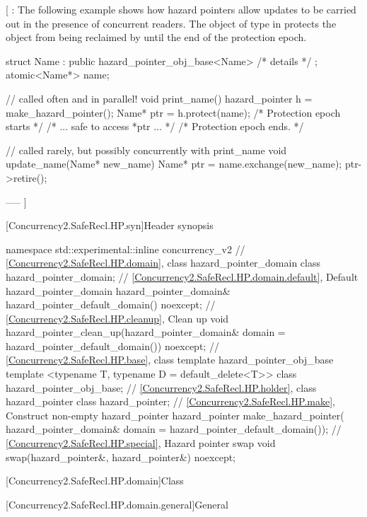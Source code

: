 [ : The following example shows how hazard pointers allow updates to be carried out in the presence of concurrent readers. The object of type  in  protects the object  from being reclaimed by  until the end of the protection epoch.

\begin{codeblock}
struct Name : public hazard_pointer_obj_base<Name> { /* details */ };
atomic<Name*> name;

// called often and in parallel!
void print_name() {
  hazard_pointer h = make_hazard_pointer();
  Name* ptr = h.protect(name); /* Protection epoch starts */
  /* ... safe to access *ptr ... */
} /* Protection epoch ends. */

// called rarely, but possibly concurrently with print_name
void update_name(Name* new_name) {
  Name* ptr = name.exchange(new_name);
  ptr->retire();
}
\end{codeblock}
--—  ]

[Concurrency2.SafeRecl.HP.syn]{Header  synopsis}

\begin{codeblock}
namespace std::experimental::inline concurrency_v2 {
  // \ref{Concurrency2.SafeRecl.HP.domain}, class hazard_pointer_domain
  class hazard_pointer_domain;
  // \ref{Concurrency2.SafeRecl.HP.domain.default}, Default hazard_pointer_domain
  hazard_pointer_domain& hazard_pointer_default_domain() noexcept;
  // \ref{Concurrency2.SafeRecl.HP.cleanup}, Clean up
  void hazard_pointer_clean_up(hazard_pointer_domain& domain = hazard_pointer_default_domain())
    noexcept;
  // \ref{Concurrency2.SafeRecl.HP.base}, class template hazard_pointer_obj_base
  template <typename T, typename D = default_delete<T>> class hazard_pointer_obj_base;
  // \ref{Concurrency2.SafeRecl.HP.holder}, class hazard_pointer
  class hazard_pointer;
  // \ref{Concurrency2.SafeRecl.HP.make}, Construct non-empty hazard_pointer
  hazard_pointer make_hazard_pointer(
    hazard_pointer_domain& domain = hazard_pointer_default_domain());
  // \ref{Concurrency2.SafeRecl.HP.special}, Hazard pointer swap
  void swap(hazard_pointer&, hazard_pointer&) noexcept;
}
\end{codeblock}

[Concurrency2.SafeRecl.HP.domain]{Class }

[Concurrency2.SafeRecl.HP.domain.general]{General}


